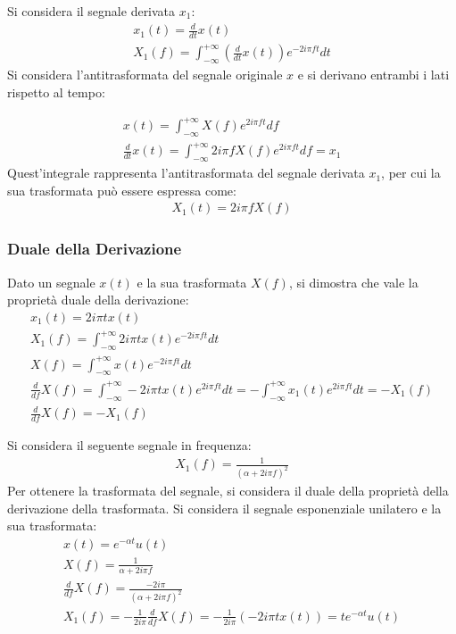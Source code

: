 \documentclass{article}
\numberwithin{equation}{subsection}
\begin{document}
Si considera il segnale derivata $x_1$:
\begin{gather*}
    x_1(t)=\displaystyle\frac{d}{dt}x(t)\\
    X_1(f)=\displaystyle\int_{-\infty}^{+\infty}\left(\frac{d}{dt}x(t)\right)e^{-2i\pi ft}dt
\end{gather*}
Si considera l'antitrasformata del segnale originale $x$ e si derivano entrambi i lati rispetto al tempo: 

\begin{gather*}
    x(t)=\displaystyle\int_{-\infty}^{+\infty}X(f)e^{2i\pi ft}df\\
    \displaystyle\frac{d}{dt}x(t)=\int_{-\infty}^{+\infty}2i\pi fX(f)e^{2i\pi ft}df=x_1
\end{gather*}
Quest'integrale rappresenta l'antitrasformata del segnale derivata $x_1$, per cui la sua trasformata può essere espressa come:
\begin{gather*} 
    X_1(t)=2i\pi fX(f)
\end{gather*}

\subsubsection{Duale della Derivazione}
Dato un segnale $x(t)$ e la sua trasformata $X(f)$, si dimostra che vale la proprietà duale della derivazione: 
\begin{gather*}
    x_1(t)=2i\pi tx(t)\\
    X_1(f)=\displaystyle\int_{-\infty}^{+\infty}2i\pi tx(t)e^{-2i\pi ft}dt\\
    X(f)=\displaystyle\int_{-\infty}^{+\infty}x(t)e^{-2i\pi ft}dt\\
    \displaystyle\frac{d}{df}X(f)=\int_{-\infty}^{+\infty}-2i\pi t x(t)e^{2i\pi ft}dt=-\int_{-\infty}^{+\infty}x_1(t)e^{2i\pi ft}dt=-X_1(f)\\
    \displaystyle\frac{d}{df}X(f)=-X_1(f)
\end{gather*}


Si considera il seguente segnale in frequenza:
\begin{gather*}
    X_1(f)=\displaystyle\frac{1}{(\alpha+2i\pi f)^2}
\end{gather*}
Per ottenere la trasformata del segnale, si considera il duale della proprietà della derivazione della trasformata. Si considera il segnale esponenziale unilatero e la sua 
trasformata:
\begin{gather*}
    x(t)=e^{-\alpha t}u(t)\\
    X(f)=\displaystyle\frac{1}{\alpha+2i\pi f}\\
    \displaystyle\frac{d}{df}X(f)=\frac{-2i\pi}{(\alpha+2i\pi f)^2}\\
    X_1(f)=\displaystyle-\frac{1}{2i\pi}\frac{d}{df}X(f)=-\frac{1}{2i\pi}(-2i\pi tx(t))=te^{-\alpha t}u(t)
\end{gather*}
\end{document}
